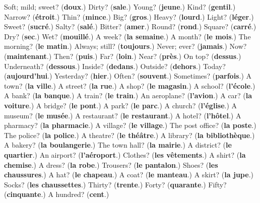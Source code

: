 \begin{tcolorbox}[breakable,colback=teal!4,colframe=teal!35!black,title={Before you move on}]
Soft; mild; sweet? (\textbf{doux}.) Dirty? (\textbf{sale}.) Young? (\textbf{jeune}.) Kind? (\textbf{gentil}.) Narrow? (\textbf{étroit}.) Thin? (\textbf{mince}.) Big? (\textbf{gros}.) Heavy? (\textbf{lourd}.) Light? (\textbf{léger}.) Sweet? (\textbf{sucré}.) Salty? (\textbf{salé}.) Bitter? (\textbf{amer}.) Round? (\textbf{rond}.) Square? (\textbf{carré}.) Dry? (\textbf{sec}.) Wet? (\textbf{mouillé}.) A week? (\textbf{la semaine}.) A month? (\textbf{le mois}.) The morning? (\textbf{le matin}.) Always; still? (\textbf{toujours}.) Never; ever? (\textbf{jamais}.) Now? (\textbf{maintenant}.) Then? (\textbf{puis}.) Far? (\textbf{loin}.) Near? (\textbf{près}.) On top? (\textbf{dessus}.) Underneath? (\textbf{dessous}.) Inside? (\textbf{dedans}.) Outside? (\textbf{dehors}.) Today? (\textbf{aujourd'hui}.) Yesterday? (\textbf{hier}.) Often? (\textbf{souvent}.) Sometimes? (\textbf{parfois}.) A town? (\textbf{la ville}.) A street? (\textbf{la rue}.) A shop? (\textbf{le magasin}.) A school? (\textbf{l'école}.) A bank? (\textbf{la banque}.) A train? (\textbf{le train}.) An aeroplane? (\textbf{l'avion}.) A car? (\textbf{la voiture}.) A bridge? (\textbf{le pont}.) A park? (\textbf{le parc}.) A church? (\textbf{l'église}.) A museum? (\textbf{le musée}.) A restaurant? (\textbf{le restaurant}.) A hotel? (\textbf{l'hôtel}.) A pharmacy? (\textbf{la pharmacie}.) A village? (\textbf{le village}.) The post office? (\textbf{la poste}.) The police? (\textbf{la police}.) A theatre? (\textbf{le théâtre}.) A library? (\textbf{la bibliothèque}.) A bakery? (\textbf{la boulangerie}.) The town hall? (\textbf{la mairie}.) A district? (\textbf{le quartier}.) An airport? (\textbf{l'aéroport}.) Clothes? (\textbf{les vêtements}.) A shirt? (\textbf{la chemise}.) A dress? (\textbf{la robe}.) Trousers? (\textbf{le pantalon}.) Shoes? (\textbf{les chaussures}.) A hat? (\textbf{le chapeau}.) A coat? (\textbf{le manteau}.) A skirt? (\textbf{la jupe}.) Socks? (\textbf{les chaussettes}.) Thirty? (\textbf{trente}.) Forty? (\textbf{quarante}.) Fifty? (\textbf{cinquante}.) A hundred? (\textbf{cent}.)
\end{tcolorbox}

